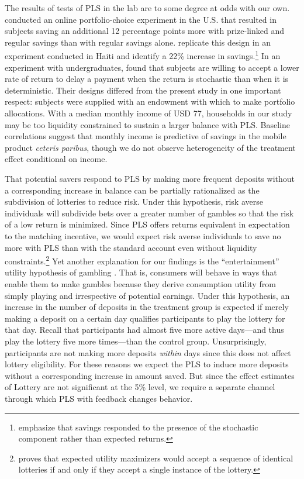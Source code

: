 \documentclass[11pt]{article}
\begin{document}
		The results of tests of PLS in the lab are to some degree at odds with our own. \textcite{atalay_savings_2014} conducted an online portfolio-choice experiment in the U.S. that resulted in subjects saving an additional 12 percentage points more with prize-linked and regular savings than with regular savings alone. \textcite{dizon_leveraging_2016} replicate this design in an experiment conducted in Haiti and identify a 22\% increase in savings.\footnote{\textcite{dizon_leveraging_2016} emphasize that savings responded to the presence of the stochastic component rather than expected returns.} In an experiment with undergraduates, \textcite{filiz-ozbay_lottery_2015} found that subjects are willing to accept a lower rate of return to delay a payment when the return is stochastic than when it is deterministic. Their designs differed from the present study in one important respect: subjects were supplied with an endowment with which to make portfolio allocations. With a median monthly income of USD 77, households in our study may be too liquidity constrained to sustain a larger balance with PLS. Baseline correlations suggest that monthly income is predictive of savings in the mobile product \textit{ceteris paribus}, though we do not observe heterogeneity of the treatment effect conditional on income.

		That potential savers respond to PLS by making more frequent deposits without a corresponding increase in balance can be partially rationalized as the subdivision of lotteries to reduce risk. Under this hypothesis, risk averse individuals will subdivide bets over a greater number of gambles so that the risk of a low return is minimized. Since PLS offers returns equivalent in expectation to the matching incentive, we would expect risk averse individuals to save no more with PLS than with the standard account even without liquidity constraints.\footnote{\textcite{samuelson_risk_1963} proves that expected utility maximizers would accept a sequence of identical lotteries if and only if they accept a single instance of the lottery.} Yet another explanation for our findings is the ``entertainment'' utility hypothesis of gambling \parencite{conlisk_utility_1993}. That is, consumers will behave in ways that enable them to make gambles because they derive consumption utility from simply playing and irrespective of potential earnings. Under this hypothesis, an increase in the number of deposits in the treatment group is expected if merely making a deposit on a certain day qualifies participants to play the lottery for that day. Recall that participants had almost five more active days---and thus play the lottery five more times---than the control group. Unsurprisingly, participants are not making more deposits \textit{within} days since this does not affect lottery eligibility. For these reasons we expect the PLS to induce more deposits without a corresponding increase in amount saved. But since the effect estimates of Lottery are not significant at the 5\% level, we require a separate channel through which PLS with feedback changes behavior.
\end{document}

